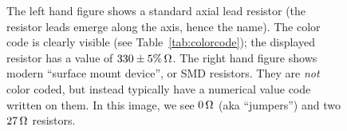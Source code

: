 \documentclass[12pt]{article}
\begin{document}
\begin{figure}
  \centering
     \qquad
  \caption{The left hand figure shows a standard axial lead resistor
    (the resistor leads emerge along the axis, hence the name).  The
    color code is clearly visible (see Table~\ref{tab:colorcode}); the
    displayed resistor has a value of $\unit[330 \pm 5\%]{\Omega}$.
    The right hand figure shows modern ``surface mount device'', or
    SMD resistors.  They are \textit{not} color coded, but instead
    typically have a numerical value code written on them.  In this
    image, we see $\unit[0]{\Omega}$ (aka ``jumpers'') and two
    $\unit[27]{\Omega}$ resistors.}
  \label{fig:resistors}
\end{figure}
\end{document}

